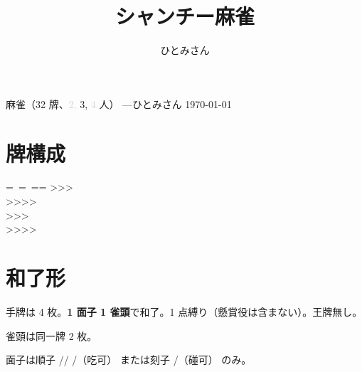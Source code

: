 \documentclass[line_length=50zw,head_space=2cm,foot_space=1cm]{jlreq}
\newcommand{\特殊}{\textsuperscript ☆}
\begin{document}
\pagestyle{empty}

\vspace{-1cm}
\title{シャンチー麻雀}
\author{ひとみさん}

\begin{center}
	{\LARGE {}麻雀}（32 牌、\textcolor{lightgray}{2,} 3, \textcolor{lightgray}{4} 人）%
	---ひとみさん \today
\end{center}

\setlength{\parindent}{0pt}

\section{牌構成}
\begin{table}[h]
	\centering\Huge
	\newlength{\TableWidth}
	\begin{minipage}{\TableWidth}
		\setlength{\baselineskip}{0\zh}
		\begin{Tabbing}
			\TAB=\ \TAB=\ \TAB=\hspace{.65\zw}\TAB=\kill
			\TAB>\TAB>\TAB>
				\xq{R}{P}\\
			\TAB>\TAB>\TAB>\TAB>\\
			\TAB>\TAB>\xq{B}{C}\TAB>
				\xq{B}{P}\\
			\TAB>\TAB>\TAB>\TAB>\xq{B}{P}
		\end{Tabbing}
	\end{minipage}
\end{table}

\section{和了形}
手牌は 4 枚。\textbf{1 面子 1 雀頭}で和了。1 点縛り（懸賞役は含まない）。王牌無し。

雀頭は同一牌 2 枚。

面子は順子 //%
/（吃可）
または刻子 /（碰可） のみ。
\end{document}
